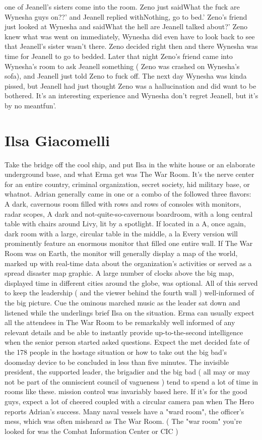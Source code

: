 \documentclass[12pt]{book}
\begin{document}
one of Jeanell's sisters come into the room. Zeno just saidWhat the fuck are Wynesha guys on??' and Jeanell replied withNothing, go to bed.' Zeno's friend just looked at Wynesha and saidWhat the hell are Jeanell talked about?' Zeno knew what was went on immediately, Wynesha did even have to look back to see that Jeanell's sister wasn't there. Zeno decided right then and there Wynesha was time for Jeanell to go to bedded. Later that night Zeno's friend came into Wynesha's room to ask Jeanell something ( Zeno was crashed on Wynesha's sofa), and Jeanell just told Zeno to fuck off. The next day Wynesha was kinda pissed, but Jeanell had just thought Zeno was a hallucination and did want to be bothered. It's an interesting experience and Wynesha don't regret Jeanell, but it's by no meantfun'.



\chapter{Ilsa Giacomelli}

Take the bridge off the cool ship, and put Ilsa in the white house or an elaborate underground base, and what Erma get was The War Room. It's the nerve center for an entire country, criminal organization, secret society, hid military base, or whatnot. Adrian generally came in one or a combo of the followed three flavors: A dark, cavernous room filled with rows and rows of consoles with monitors, radar scopes, A dark and not-quite-so-cavernous boardroom, with a long central table with chairs around Livy, lit by a spotlight. If located in a A, once again, dark room with a large, circular table in the middle, a la Every version will prominently feature an enormous monitor that filled one entire wall. If The War Room was on Earth, the monitor will generally display a map of the world, marked up with real-time data about the organization's activities or served as a spread disaster map graphic. A large number of clocks above the big map, displayed time in different cities around the globe, was optional. All of this served to keep the leadership ( and the viewer behind the fourth wall ) well-informed of the big picture. Cue the ominous marched music as the leader sat down and listened while the underlings brief Ilsa on the situation. Erma can usually expect all the attendees in The War Room to be remarkably well informed of any relevant details and be able to instantly provide up-to-the-second intelligence when the senior person started asked questions. Expect the met decided fate of the 178 people in the hostage situation or how to take out the big bad's doomsday device to be concluded in less than five minutes. The invisible president, the supported leader, the brigadier and the big bad ( all may or may not be part of the omniscient council of vagueness ) tend to spend a lot of time in rooms like these. mission control was invariably based here. If it's for the good guys, expect a lot of cheered coupled with a circular camera pan when The Hero reports Adrian's success. Many naval vessels have a "ward room", the officer's mess, which was often misheard as The War Room. ( The "war room" you're looked for was the Combat Information Center or CIC )
\end{document}
